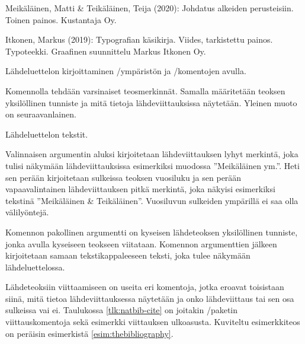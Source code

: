 \begin{esimerkki}
\begin{koodilohko}
  \begin{thebibliography}{00}

    Meikäläinen, Matti \& Teikäläinen, Teija (2020): Johdatus alkeiden
    perusteisiin. Toinen painos. Kustantaja Oy.

   Itkonen, Markus (2019):
    Typografian käsikirja. Viides, tarkistettu painos. Typoteekki.
    Graafinen suunnittelu Markus Itkonen Oy.

  \end{thebibliography}
\end{koodilohko}
\caption{Lähdeluettelon kirjoittaminen
  \-/ympäristön ja \-/komentojen avulla.}
\label{esim:thebibliography}
\end{esimerkki}

Komennolla  tehdään varsinaiset teosmerkinnät.
Samalla määritetään teoksen yksilöllinen tunniste ja mitä tietoja
lähdeviittauksissa näytetään. Yleinen muoto on seuraavanlainen.

\begin{koodilohkosis}
   Lähdeluettelon tekstit.
\end{koodilohkosis}

Valinnaisen argumentin aluksi kirjoitetaan lähdeviittauksen lyhyt
merkintä, joka tulisi näkymään lähdeviittauksissa esimerkiksi muodossa
''Meikäläinen ym.''. Heti sen perään kirjoitetaan sulkeissa teoksen
vuosiluku ja sen perään vapaavalintainen lähdeviittauksen pitkä
merkintä, joka näkyisi esimerkiksi tekstinä ''Meikäläinen \&
Teikäläinen''. Vuosiluvun sulkeiden ympärillä ei saa olla välilyöntejä.

Komennon pakollinen argumentti on kyseisen lähdeteoksen yksilöllinen
tunniste, jonka avulla kyseiseen teokseen viitataan. Komennon
argumenttien jälkeen kirjoitetaan samaan tekstikappaleeseen teksti, joka
tulee näkymään lähdeluettelossa.

Lähdeteoksiin viittaamiseen on useita eri komentoja, jotka eroavat
toisistaan siinä, mitä tietoa lähdeviittauksessa näytetään ja onko
lähdeviittaus tai sen osa sulkeissa vai ei. Taulukossa
\ref{tlk:natbib-cite} on joitakin \-/paketin
viittauskomentoja sekä esimerkki viittauksen ulkoasusta. Kuviteltu
esimerkkiteos on peräisin esimerkistä \ref{esim:thebibliography}.

